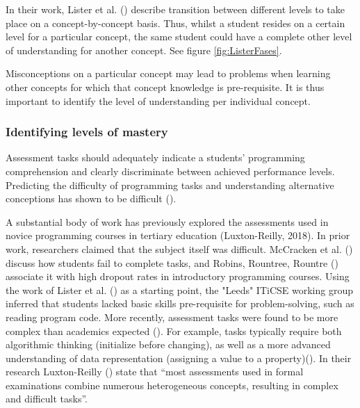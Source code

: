 In their work, Lister et al. (\cite{lister2004multi}) describe transition between different levels to take place on a concept-by-concept basis. Thus, whilst a student resides on a certain level for a particular concept, the same student could have a complete other level of understanding for another concept. See figure \ref{fig:ListerFases}.





Misconceptions on a particular concept may lead to problems when learning other concepts for which that concept knowledge is pre-requisite. It is thus important to identify the level of understanding per individual concept.



\subsubsection*{Identifying levels of mastery}
Assessment tasks should adequately indicate a students’ programming comprehension and clearly discriminate between achieved performance levels. Predicting the difficulty of programming tasks and understanding alternative conceptions has shown to be difficult (\cite{Lonati2017Bebras}).


A substantial body of work has previously explored the assessments used in novice programming courses in tertiary education (Luxton-Reilly, 2018). In prior work, researchers claimed that the subject itself was difficult. McCracken et al. (\cite{McCracken2001}) discuss how students fail to complete tasks, and Robins, Rountree, Rountre (\cite{robins2003learning}) associate it with high dropout rates in introductory programming courses. Using the work of Lister et al. (\cite{lister2004multi}) as a starting point, the "Leeds" ITiCSE working group inferred that students lacked basic skills pre-requisite for problem-solving, such as reading program code. More recently, assessment tasks were found to be more complex than academics expected (\cite{LuxtonReilly2018}). For example, tasks typically require both algorithmic thinking (initialize before changing), as well as a more advanced understanding of data representation (assigning a value to a property)(\cite{Seiter2013}). In their research Luxton-Reilly (\cite{LuxtonReilly2018}) state that “most assessments used in formal examinations combine numerous heterogeneous concepts, resulting in complex and difficult tasks”.

